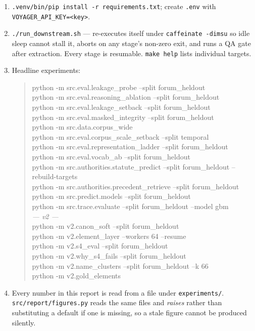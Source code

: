 \documentclass[12pt,a4paper]{article}
\newcommand{\code}[1]{\texttt{\small #1}}
\begin{document}
\begin{enumerate}
\item \code{.venv/bin/pip install -r requirements.txt}; create \code{.env} with
\code{VOYAGER\_API\_KEY=<key>}.
\item \code{./run\_downstream.sh} --- re-executes itself under \code{caffeinate -dimsu} so idle sleep
cannot stall it, aborts on any stage's non-zero exit, and runs a QA gate after extraction. Every
stage is resumable. \code{make help} lists individual targets.
\item Headline experiments:
\begin{quote}\footnotesize\ttfamily\raggedright
python -m src.eval.leakage\_probe --split forum\_heldout\\
python -m src.eval.reasoning\_ablation --split forum\_heldout\\
python -m src.eval.leakage\_setback --split forum\_heldout\\
python -m src.eval.masked\_integrity --split forum\_heldout\\
python -m src.data.corpus\_wide\\
python -m src.eval.corpus\_scale\_setback --split temporal\\
python -m src.eval.representation\_ladder --split forum\_heldout\\
python -m src.eval.vocab\_ab --split forum\_heldout\\
python -m src.authorities.statute\_predict --split forum\_heldout --rebuild-targets\\
python -m src.authorities.precedent\_retrieve --split forum\_heldout\\
python -m src.predict.models --split forum\_heldout\\
python -m src.trace.evaluate --split forum\_heldout --model gbm\\
\hspace*{1em}\textit{--- v2 ---}\\
python -m v2.canon\_soft --split forum\_heldout\\
python -m v2.element\_layer --workers 64 --resume\\
python -m v2.s4\_eval --split forum\_heldout\\
python -m v2.why\_s4\_fails --split forum\_heldout\\
python -m v2.name\_clusters --split forum\_heldout --k 66\\
python -m v2.gold\_elements
\end{quote}
\item Every number in this report is read from a file under \code{experiments/}.
\code{src/report/figures.py} reads the same files and \emph{raises} rather than substituting a
default if one is missing, so a stale figure cannot be produced silently.
\end{enumerate}
\end{document}
